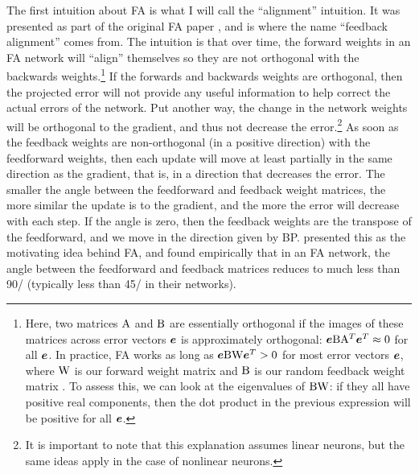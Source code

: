 The first intuition about FA is what I will call the ``alignment'' intuition.
It was presented as part of the original FA paper \parencite{Lillicrap2014},
and is where the name ``feedback alignment'' comes from.
The intuition is that over time, the forward weights in an FA network
will ``align'' themselves so they are not orthogonal with the backwards weights.\footnote{
  Here, two matrices $\mathrm{A}$ and $\mathrm{B}$ are essentially orthogonal
  if the images of these matrices across error vectors $\boldsymbol{e}$
  is approximately orthogonal:
  $\boldsymbol{e} \mathrm{B} \mathrm{A}^T \boldsymbol{e}^T \approx 0$ for all $\boldsymbol{e}$.
  In practice, FA works as long as $\boldsymbol{e} \mathrm{B} \mathrm{W} \boldsymbol{e}^T > 0$
  for most error vectors $\boldsymbol{e}$,
  where $\mathrm{W}$ is our forward weight matrix
  and $\mathrm{B}$ is our random feedback weight matrix \parencite{Lillicrap2014}.
  To assess this, we can look at the eigenvalues of $\mathrm{B} \mathrm{W}$:
  if they all have positive real components,
  then the dot product in the previous expression will be positive for all $\boldsymbol{e}$.}
If the forwards and backwards weights are orthogonal,
then the projected error will not provide any useful information
to help correct the actual errors of the network.
Put another way, the change in the network weights
will be orthogonal to the gradient,
and thus not decrease the error.\footnote{
  It is important to note that this explanation assumes linear neurons,
  but the same ideas apply in the case of nonlinear neurons.}
As soon as the feedback weights are non-orthogonal (in a positive direction)
with the feedforward weights,
then each update will move at least partially in the same direction as the gradient,
that is, in a direction that decreases the error.
The smaller the angle between the feedforward and feedback weight matrices,
the more similar the update is to the gradient,
and the more the error will decrease with each step.
If the angle is zero, then the feedback weights are the transpose of the feedforward,
and we move in the direction given by BP.
\textcite{Lillicrap2014} presented this as the motivating idea behind FA,
and found empirically that in an FA network,
the angle between the feedforward and feedback matrices
reduces to much less than 90\degree/ (typically less than 45\degree/ in their networks).

